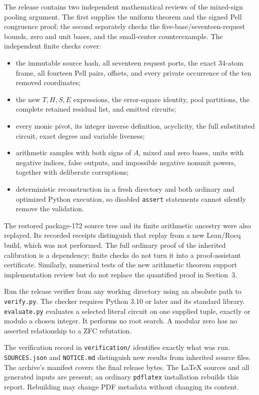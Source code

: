 \documentclass[10pt,letterpaper]{article}
\theoremstyle{remark}\newtheorem{remark}[theorem]{Remark}
\begin{document}
The release contains two independent mathematical reviews of the
mixed-sign pooling argument. The first supplies the uniform theorem and
the signed Pell congruence proof; the second separately checks the
five-base/seventeen-request bounds, zero and unit bases, and the
small-center counterexample. The independent finite checks cover:
\begin{itemize}
\item the immutable source hash, all seventeen request ports, the exact
      34-atom frame, all fourteen Pell pairs, offsets, and every private
      occurrence of the ten removed coordinates;
\item the new $T,H,S,E$ expressions, the error-square identity, pool
      partitions, the complete retained residual list, and emitted circuits;
\item every monic pivot, its integer inverse definition, acyclicity,
      the full substituted circuit, exact degree and variable liveness;
\item arithmetic samples with both signs of $A$, mixed and zero bases,
      units with negative indices, false outputs, and impossible negative
      nonunit powers, together with deliberate corruptions;
\item deterministic reconstruction in a fresh directory and both ordinary
      and optimized Python execution, so disabled \texttt{assert}
      statements cannot silently remove the validation.
\end{itemize}

The restored package-172 source tree and its finite arithmetic ancestry
were also replayed. Its recorded receipts distinguish that replay from
a new Lean/Rocq build, which was not performed. The full ordinary proof
of the inherited calibration is a dependency; finite checks do not turn
it into a proof-assistant certificate. Similarly, numerical tests of
the new arithmetic theorem support implementation review but do not
replace the quantified proof in Section~3.

Run the release verifier from any working directory using an absolute
path to \texttt{verify.py}. The checker requires Python 3.10 or later
and its standard library. \texttt{evaluate.py} evaluates a selected
literal circuit on one supplied tuple, exactly or modulo a chosen
integer. It performs no root search. A modular zero has no asserted
relationship to a ZFC refutation.

The verification record in \texttt{verification/} identifies exactly
what was run. \texttt{SOURCES.json} and \texttt{NOTICE.md} distinguish
new results from inherited source files. The archive's manifest covers
the final release bytes. The \LaTeX{} sources and all generated inputs
are present; an ordinary \texttt{pdflatex} installation rebuilds this
report. Rebuilding may change PDF metadata without changing its content.
\end{document}
